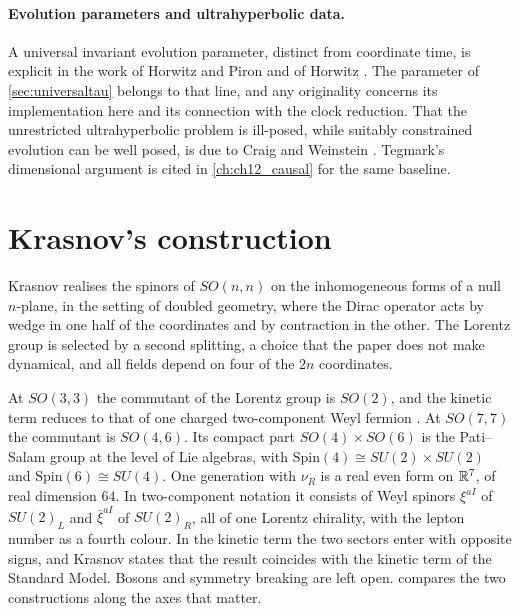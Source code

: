 \paragraph{Evolution parameters and ultrahyperbolic data.} A universal invariant evolution parameter, distinct from coordinate time, is
explicit in the work of Horwitz and Piron \cite{HorwitzPiron73} and of Horwitz \cite{Horwitz20}. The parameter of \cref{sec:universaltau}
belongs to that line, and any originality concerns its implementation here and its connection with the clock reduction. That the unrestricted
ultrahyperbolic problem is ill-posed, while suitably constrained evolution can be well posed, is due to Craig and Weinstein
\cite{CraigWeinstein09}. Tegmark's dimensional argument \cite{Tegmark97} is cited in \cref{ch:ch12_causal} for the same baseline.

\section{Krasnov's construction}
\label{sec:rel:krasnov}

Krasnov \cite{Krasnov18} realises the spinors of $SO(n,n)$ on the inhomogeneous forms of a null $n$-plane, in the setting of doubled
geometry, where the Dirac operator acts by wedge in one half of the coordinates and by contraction in the other. The Lorentz group is
selected by a second splitting, a choice that the paper does not make dynamical, and all fields depend on four of the $2n$ coordinates.

At $SO(3,3)$ the commutant of the Lorentz group is $SO(2)$, and the kinetic term reduces to that of one charged two-component Weyl fermion
\cite[\S4]{Krasnov18}. At $SO(7,7)$ the commutant is $SO(4,6)$. Its compact part $SO(4)\times SO(6)$ is the Pati--Salam group at the level of
Lie algebras, with $\mathrm{Spin}(4)\cong SU(2)\times SU(2)$ and $\mathrm{Spin}(6)\cong SU(4)$. One generation with $\nu_R$ is a real even
form on $\mathbb{R}^7$, of real dimension $64$. In two-component notation it consists of Weyl spinors $\xi^{aI}$ of $SU(2)_L$ and $\bar\xi^{aI}$ of
$SU(2)_R$, all of one Lorentz chirality, with the lepton number as a fourth colour. In the kinetic term \cite[eq.~(219)]{Krasnov18} the two
sectors enter with opposite signs, and Krasnov states that the result coincides with the kinetic term of the Standard Model. Bosons and
symmetry breaking are left open.  compares the two constructions along the axes that matter.

